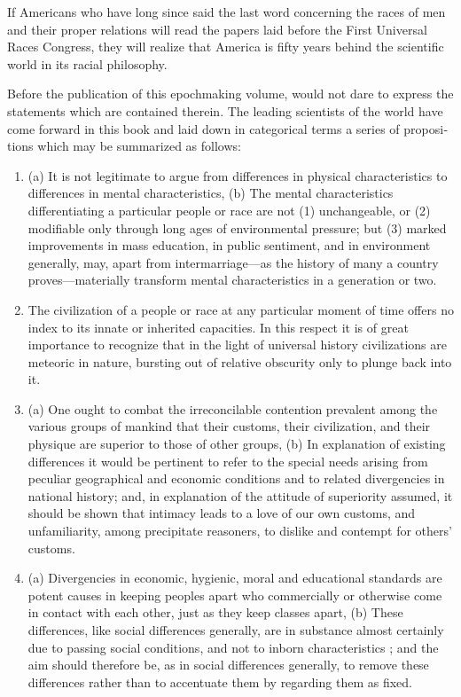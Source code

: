 \documentclass[letterpaper,10pt,english]{jupyterBook}
\begin{document}
\sphinxAtStartPar
If Americans who have long since said the last word con­cerning the races of men and their proper relations will read the papers laid before the First Universal Races Congress, they will realize that America is fifty years behind the scientific world in its racial philosophy.

\sphinxAtStartPar
Before the publication of this epoch\sphinxhyphen{}making volume,  would not dare to express the statements which are contained therein. The leading scientists of the world have come forward in this book and laid down in categorical terms a series of proposi­tions which may be summarized as follows:
\begin{enumerate}
%
\item {} 
\sphinxAtStartPar
(a) It is not legitimate to argue from differences in physical characteristics to differences in mental characteristics, (b) The mental characteristics differentiating a particular people or race are not (1) unchangeable, or (2) modifiable only through long ages of environmental pressure; but (3) marked improvements in mass education, in public sentiment, and in environment generally, may, apart from intermarriage—as the history of many a country proves—materially transform mental characteristics in a generation or two.

\item {} 
\sphinxAtStartPar
The civilization of a people or race at any particular moment of time offers no index to its innate or inherited capacities. In this respect it is of great importance to recognize that in the light of universal history civilizations are meteoric in nature, bursting out of relative obscurity only to plunge back into it.

\item {} 
\sphinxAtStartPar
(a) One ought to combat the irreconcilable contention prevalent among the various groups of mankind that their customs, their civilization, and their physique are superior to those of other groups, (b) In explanation of existing differences it would be pertinent to refer to the special needs arising from peculiar geographical and economic conditions and to related divergencies in national history; and, in explanation of the attitude of superiority assumed, it should be shown that intimacy leads to a love of our own customs, and unfamiliarity, among precipitate reasoners, to dislike and contempt for others’ customs.

\item {} 
\sphinxAtStartPar
(a) Divergencies in economic, hygienic, moral and educational standards are potent causes in keeping peoples apart who commercially or otherwise come in contact with each other, just as they keep classes apart, (b) These differences, like social differences generally, are in substance almost certainly due to passing social conditions, and not to inborn characteristics ; and the aim should therefore be, as in social differences generally, to remove these differences rather than to accentuate them by regarding them as fixed.


\end{enumerate}
\end{document}
